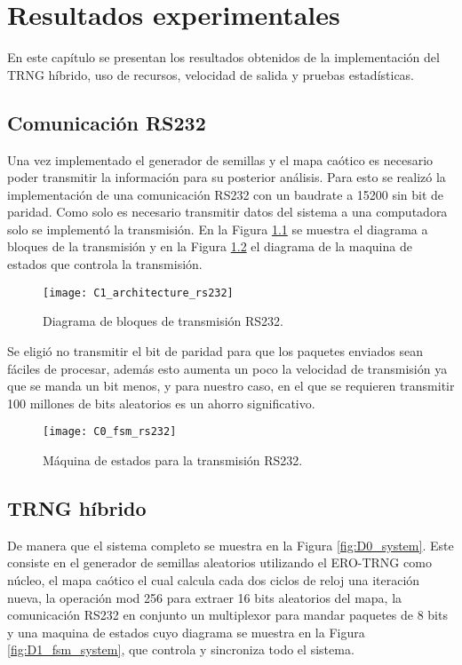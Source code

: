 \chapter{Resultados experimentales}

    En este capítulo se presentan los resultados obtenidos de la implementación del TRNG híbrido, uso de recursos, velocidad de salida y pruebas estadísticas.

    \section{Comunicación RS232}

    Una vez implementado el generador de semillas y el mapa caótico es necesario poder transmitir la información para su posterior análisis. Para esto se realizó la implementación de una comunicación RS232 con un baudrate a 15200 sin bit de paridad. Como solo es necesario transmitir datos del sistema a una computadora  solo se implementó la transmisión. En la Figura \ref{fig:C1_architecture_rs232} se muestra el diagrama a bloques de la transmisión y en la Figura \ref{fig:C0_fsm_rs232} el diagrama de la maquina de estados que controla la transmisión.

        \begin{figure}[hbtp]
            \centering
            \texttt{[image: C1\_architecture\_rs232]}
            \caption{Diagrama de bloques de transmisión RS232.}
            \label{fig:C1_architecture_rs232}
        \end{figure}

        Se eligió no transmitir el bit de paridad para que los paquetes enviados sean fáciles de procesar, además esto aumenta un poco la velocidad de transmisión ya que se manda un bit menos, y para nuestro caso, en el que se requieren transmitir 100 millones de bits aleatorios es un ahorro significativo. 

        \begin{figure}[hbtp]
            \centering
            \texttt{[image: C0\_fsm\_rs232]}
            \caption{Máquina de estados para la transmisión RS232.}
            \label{fig:C0_fsm_rs232}
        \end{figure}	

    \section{TRNG híbrido}

        De manera que el sistema completo se muestra en la Figura \ref{fig:D0_system}. Este consiste en el generador de semillas aleatorios utilizando el ERO-TRNG como núcleo, el mapa caótico el cual calcula cada dos ciclos de reloj una iteración nueva, la operación mod 256 para extraer 16 bits aleatorios del mapa, la comunicación RS232 en conjunto un multiplexor para mandar paquetes de 8 bits y una maquina de estados cuyo diagrama se muestra en la Figura \ref{fig:D1_fsm_system}, que controla y sincroniza todo el sistema.

